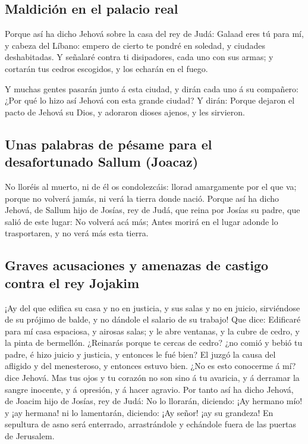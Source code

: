 \hypertarget{maldiciuxf3n-en-el-palacio-real}{%
\subsection{Maldición en el palacio
real}\label{maldiciuxf3n-en-el-palacio-real}}

 Porque así ha dicho Jehová sobre la casa del rey de Judá:
Galaad eres tú para mí, y cabeza del Líbano: empero de cierto te pondré
en soledad, y ciudades deshabitadas.  Y señalaré contra ti
disipadores, cada uno con sus armas; y cortarán tus cedros escogidos, y
los echarán en el fuego.

 Y muchas gentes pasarán junto á esta ciudad, y dirán cada
uno á su compañero: ¿Por qué lo hizo así Jehová con esta grande ciudad?
 Y dirán: Porque dejaron el pacto de Jehová su Dios, y
adoraron dioses ajenos, y les sirvieron.

\hypertarget{unas-palabras-de-puxe9same-para-el-desafortunado-sallum-joacaz}{%
\subsection{Unas palabras de pésame para el desafortunado Sallum
(Joacaz)}\label{unas-palabras-de-puxe9same-para-el-desafortunado-sallum-joacaz}}

 No lloréis al muerto, ni de él os condolezcáis: llorad
amargamente por el que va; porque no volverá jamás, ni verá la tierra
donde nació.  Porque así ha dicho Jehová, de Sallum hijo
de Josías, rey de Judá, que reina por Josías su padre, que salió de este
lugar: No volverá acá más;  Antes morirá en el lugar
adonde lo trasportaren, y no verá más esta tierra.

\hypertarget{graves-acusaciones-y-amenazas-de-castigo-contra-el-rey-jojakim}{%
\subsection{Graves acusaciones y amenazas de castigo contra el rey
Jojakim}\label{graves-acusaciones-y-amenazas-de-castigo-contra-el-rey-jojakim}}

 ¡Ay del que edifica su casa y no en justicia, y sus
salas y no en juicio, sirviéndose de su prójimo de balde, y no dándole
el salario de su trabajo!  Que dice: Edificaré para mí
casa espaciosa, y airosas salas; y le abre ventanas, y la cubre de
cedro, y la pinta de bermellón.  ¿Reinarás porque te
cercas de cedro? ¿no comió y bebió tu padre, é hizo juicio y justicia, y
entonces le fué bien?  El juzgó la causa del afligido y
del menesteroso, y entonces estuvo bien. ¿No es esto conocerme á mí?
dice Jehová.  Mas tus ojos y tu corazón no son sino á tu
avaricia, y á derramar la sangre inocente, y á opresión, y á hacer
agravio.  Por tanto así ha dicho Jehová, de Joacim hijo
de Josías, rey de Judá: No lo llorarán, diciendo: ¡Ay hermano mío! y ¡ay
hermana! ni lo lamentarán, diciendo: ¡Ay señor! ¡ay su grandeza!
 En sepultura de asno será enterrado, arrastrándole y
echándole fuera de las puertas de Jerusalem.


